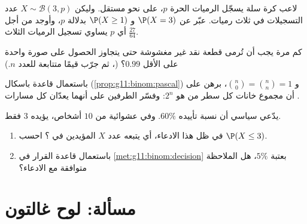 \begin{exercise}[$\star\star$]\label{exo:g11:binom:8}
لاعب كرة سلة يسجّل الرميات الحرة  $p$،
على نحو مستقل. وليكن $X \sim \mathcal B(3, p)$ عدد التسجيلات في
ثلاث رميات. عبّر عن $\P(X = 3)$ و $\P(X \geq 1)$ بدلالة $p$،
وأوجد من أجل أي $p$ يساوي  تسجيل الرميات الثلاث
$\frac{27}{64}$.
\end{exercise}

\begin{exercise}[$\star\star$]\label{exo:g11:binom:9}
كم مرة يجب أن تُرمى قطعة نقد غير مغشوشة حتى يتجاوز  الحصول
على صورة واحدة على الأقل $0.99$؟ (، ثم جرّب قيمًا
متتابعة للعدد $n$.)
\end{exercise}

\begin{exercise}[$\star\star$]\label{exo:g11:binom:10}
باستعمال قاعدة باسكال (\cref{prop:g11:binom:pascal}) و
$\binom n0 = \binom nn = 1$، برهن على أن مجموع خانات كل سطر من
 هو $2^n$: وفسّر الطرفين على أنهما يعدّان كل
مسارات .
\end{exercise}

\begin{exercise}[$\star\star\star$]\label{exo:g11:binom:11}
يدّعي سياسي أن نسبة تأييده $60\%$. وفي  عشوائية من $10$ أشخاص،
يؤيده $3$ فقط.
\begin{enumerate}
  \item في ظل هذا الادعاء، أي  يتبعه عدد $X$
        المؤيدين في ؟ احسب $\P(X \leq 3)$.
  \item باستعمال قاعدة القرار في \cref{met:g11:binom:decision} بعتبة
        $5\%$، هل الملاحظة متوافقة مع الادعاء؟
\end{enumerate}
\end{exercise}

\section{مسألة: لوح غالتون}

